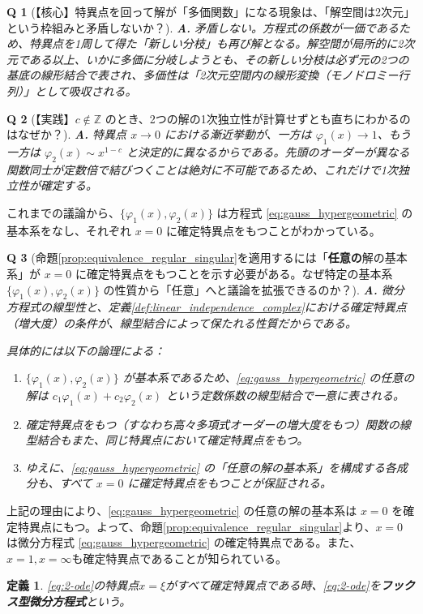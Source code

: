 \documentclass[paper=a4, fontsize=11pt]{jlreq} %
\theoremstyle{break}
\newtheorem{definition}[theorem]{定義}
\theoremstyle{qa}
\newtheorem*{Q}{Q}
\theoremstyle{remark} %
\begin{document}
\begin{Q}[【核心】特異点を回って解が「多価関数」になる現象は、「解空間は2次元」という枠組みと矛盾しないか？]
\textbf{A.} 矛盾しない。方程式の係数が一価であるため、特異点を1周して得た「新しい分枝」も再び解となる。解空間が局所的に2次元である以上、いかに多価に分岐しようとも、その新しい分枝は必ず元の2つの基底の線形結合で表され、多価性は「2次元空間内の線形変換（モノドロミー行列）」として吸収される。
\end{Q}

\begin{Q}[【実践】$c \notin \mathbb{Z}$ のとき、2つの解の1次独立性が計算せずとも直ちにわかるのはなぜか？]
\textbf{A.} 特異点 $x \to 0$ における漸近挙動が、一方は $\varphi_1(x) \to 1$、もう一方は $\varphi_2(x) \sim x^{1-c}$ と決定的に異なるからである。先頭のオーダーが異なる関数同士が定数倍で結びつくことは絶対に不可能であるため、これだけで1次独立性が確定する。
\end{Q}
これまでの議論から、$\{\varphi_{1}(x), \varphi_{2}(x)\}$ は方程式 \eqref{eq:gauss_hypergeometric} の基本系をなし、それぞれ $x=0$ に確定特異点をもつことがわかっている。

\begin{Q}[命題\ref{prop:equivalence_regular_singular}を適用するには「\textbf{任意の}解の基本系」が $x=0$ に確定特異点をもつことを示す必要がある。なぜ特定の基本系 $\{\varphi_{1}(x), \varphi_{2}(x)\}$ の性質から「任意」へと議論を拡張できるのか？]
\textbf{A.} 微分方程式の線型性と、定義\ref{def:linear_independence_complex}における確定特異点（増大度）の条件が、線型結合によって保たれる性質だからである。

具体的には以下の論理による：
\begin{enumerate}
    \item $\{\varphi_{1}(x), \varphi_{2}(x)\}$ が基本系であるため、\eqref{eq:gauss_hypergeometric} の任意の解は $c_{1}\varphi_{1}(x) + c_{2}\varphi_{2}(x)$ という定数係数の線型結合で一意に表される。
    \item 確定特異点をもつ（すなわち高々多項式オーダーの増大度をもつ）関数の線型結合もまた、同じ特異点において確定特異点をもつ。
    \item ゆえに、\eqref{eq:gauss_hypergeometric} の「任意の解の基本系」を構成する各成分も、すべて $x=0$ に確定特異点をもつことが保証される。
\end{enumerate}
\end{Q}

上記の理由により、\eqref{eq:gauss_hypergeometric} の任意の解の基本系は $x=0$ を確定特異点にもつ。よって、命題\ref{prop:equivalence_regular_singular}より、$x=0$ は微分方程式 \eqref{eq:gauss_hypergeometric} の確定特異点である。また、$x=1,x=\infty$も確定特異点であることが知られている。
\begin{definition}
    \eqref{eq:2-ode}の特異点$x=\xi$がすべて確定特異点である時、\eqref{eq:2-ode}を\textbf{フックス型微分方程式}という。
\end{definition}
\end{document}
